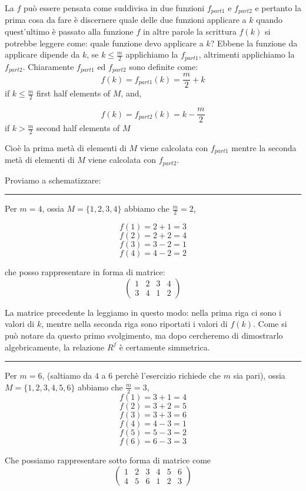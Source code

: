 \documentclass{article}
\begin{document}
La $f$ pu\`o essere pensata come suddivisa in due funzioni $f_{part1}$ e $f_{part2}$ e pertanto la prima cosa da fare \`e discernere quale delle due funzioni applicare a $k$ quando quest'ultimo \`e passato alla funzione $f$ in altre parole la scrittura $f(k)$ si potrebbe leggere come: quale funzione devo applicare a $k$? Ebbene la funzione da applicare dipende da $k$, se $k \le \frac{m}{2}$ applichiamo la $f_{part1}$, altrimenti applichiamo la $f_{part2}$. Chiaramente $f_{part1}$ ed $f_{part2}$ sono definite come: \\

\[
 f(k) = f_{part1} (k) = \frac{m}{2}+k
\]
if $k \le \frac{m}{2}$ first half elements of $M$, and,

\[
 f(k) = f_{part2} (k) = k - \frac{m}{2}
\]
if $k > \frac{m}{2}$ second half elements of $M$

Cio\`e la prima met\`a di elementi di $M$ viene calcolata con $f_{part1}$ mentre la seconda met\`a di elementi di $M$ viene calcolata con $f_{part2}$. 


Proviamo a schematizzare:

\medskip


\noindent
{\color{blue} \rule{\linewidth}{0.5mm} }

Per $m=4$, ossia $M = \{1, 2, 3, 4\}$ abbiamo che $\frac{m}{2} = 2$, 

\[f(1)= 2 + 1 = 3\] 
\[f(2)= 2 + 2 = 4\] 
\[f(3)= 3 - 2 = 1\] 
\[f(4)= 4 - 2 = 2\] 


che posso rappresentare in forma di matrice:
\[
\begin{pmatrix}
 1 & 2 & 3 & 4 \\
 3 & 4 & 1 & 2
\end{pmatrix}
\]

La matrice precedente la leggiamo in questo modo: nella prima riga ci sono i valori di $k$, mentre nella seconda riga sono riportati i valori di $f(k)$. Come si pu\`o notare da questo primo svolgimento, ma dopo cercheremo di dimostrarlo algebricamente, la relazione $R^f$ \`e certamente simmetrica.

\noindent
{\color{blue} \rule{\linewidth}{0.5mm} }

Per $m=6$, (saltiamo da $4$ a $6$ perch\`e l'esercizio richiede che $m$ sia pari), ossia $M = \{1, 2, 3, 4, 5, 6\}$ abbiamo che $\frac{m}{2} = 3$, \\

\[f(1)=3+1=4\] 
\[f(2)=3+2=5\] 
\[f(3)=3+3=6\] 
\[f(4)=4-3=1\] 
\[f(5)=5-3=2\] 
\[f(6)=6-3=3\] 

Che possiamo rappresentare sotto forma di matrice come
\[
\begin{pmatrix}
 1 & 2 & 3 & 4 & 5 & 6 \\
 4 & 5 & 6 & 1 & 2 & 3 
\end{pmatrix}
\]
\end{document}

